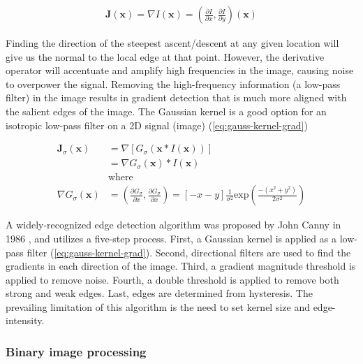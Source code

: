 \begin{equation}
    \begin{aligned}
        \mathbf{J}(\mathbf{x}) = \nabla I(\mathbf{x}) = (\frac{\partial I}{\partial x}, \frac{\partial I}{\partial y})(\mathbf{x})
    \end{aligned}
    \label{eq:img-grad}
\end{equation}

Finding the direction of the steepest ascent/descent at any given location will give us the normal to the local edge at that point. However, the derivative operator will accentuate and amplify high frequencies in the image, causing noise to overpower the signal. Removing the high-frequency information (a low-pass filter) in the image results in gradient detection that is much more aligned with the salient edges of the image. The Gaussian kernel is a good option for an isotropic low-pass filter on a 2D signal (image) (\cref{eq:gauss-kernel-grad})

\begin{equation}
    \begin{aligned}
        \mathbf{J}_{\sigma}(\mathbf{x}) &= \nabla [G_\sigma (\mathbf{x} * I(\mathbf{x}))] \\
        &= \nabla G_\sigma (\mathbf{x}) * I(\mathbf{x}) \\
        &\text{where} \\
        \nabla G_\sigma (\mathbf{x}) &= (\frac{\partial G_{\sigma}}{\partial x}, \frac{\partial G_{\sigma}}{\partial x}) = [-x - y]\frac{1}{\sigma^{2}}\text{exp}(\frac{-(x^2 + y^2)}{2 \sigma^2})
    \end{aligned}
    \label{eq:gauss-kernel-grad}
\end{equation}


A widely-recognized edge detection algorithm was proposed by John Canny in 1986 \cite{cannyComputationalApproachEdge1986}, and utilizes a five-step process.
First, a Gaussian kernel is applied as a low-pass filter (\cref{eq:gauss-kernel-grad}).
Second, directional filters are used to find the gradients in each direction of the image.
Third, a gradient magnitude threshold is applied to remove noise. Fourth, a double threshold is applied to remove both strong and weak edges.
Last, edges are determined from hysteresis. The prevailing limitation of this algorithm is the need to set kernel size and edge-intensity.

\subsubsection{Binary image processing}
\label{sec:binary-img-proc}

